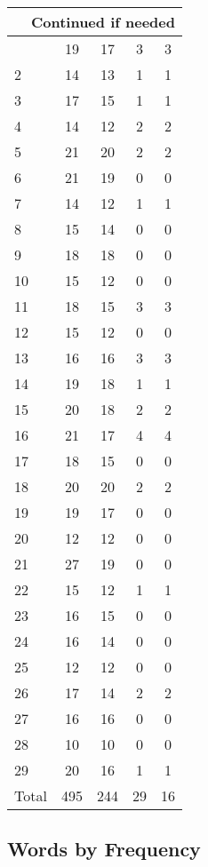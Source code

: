 \begin{center}
\begin{longtable}{l|c|c|c|c}
\hline \multicolumn{5}{|r|}{{Continued if needed}} \\ \hline
\endfoot 
1 & 19 & 17 & 3 & 3\\ \hline
2 & 14 & 13 & 1 & 1\\ \hline
3 & 17 & 15 & 1 & 1\\ \hline
4 & 14 & 12 & 2 & 2\\ \hline
5 & 21 & 20 & 2 & 2\\ \hline
6 & 21 & 19 & 0 & 0\\ \hline
7 & 14 & 12 & 1 & 1\\ \hline
8 & 15 & 14 & 0 & 0\\ \hline
9 & 18 & 18 & 0 & 0\\ \hline
10 & 15 & 12 & 0 & 0\\ \hline
11 & 18 & 15 & 3 & 3\\ \hline
12 & 15 & 12 & 0 & 0\\ \hline
13 & 16 & 16 & 3 & 3\\ \hline
14 & 19 & 18 & 1 & 1\\ \hline
15 & 20 & 18 & 2 & 2\\ \hline
16 & 21 & 17 & 4 & 4\\ \hline
17 & 18 & 15 & 0 & 0\\ \hline
18 & 20 & 20 & 2 & 2\\ \hline
19 & 19 & 17 & 0 & 0\\ \hline
20 & 12 & 12 & 0 & 0\\ \hline
21 & 27 & 19 & 0 & 0\\ \hline
22 & 15 & 12 & 1 & 1\\ \hline
23 & 16 & 15 & 0 & 0\\ \hline
24 & 16 & 14 & 0 & 0\\ \hline
25 & 12 & 12 & 0 & 0\\ \hline
26 & 17 & 14 & 2 & 2\\ \hline
27 & 16 & 16 & 0 & 0\\ \hline
28 & 10 & 10 & 0 & 0\\ \hline
29 & 20 & 16 & 1 & 1\\ \hline
\hline \hline
Total & 495 & 244 & 29 & 16




\end{longtable}
\end{center}



\subsection{Words by Frequency}


